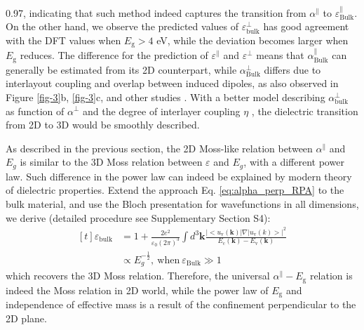 \documentclass[journal=ancac3,manuscript=article,email=true,hyperref=true,keywords=false]{achemso}
\begin{document}
0.97, indicating that such method indeed captures the transition from
$\alpha^{\parallel}$ to $\varepsilon_{\mathrm{Bulk}}^{\parallel}$. On
the other hand, we observe the predicted values of
$\varepsilon_{\mathrm{bulk}}^{\perp}$ has good agreement with the DFT
values when $E_{\mathrm{g}}>4$ eV, while the deviation becomes larger
when $E_{\mathrm{g}}$ reduces. The difference for the prediction of
$\varepsilon^{\parallel}$ and $\varepsilon^{\perp}$ means that
$\alpha^{\parallel}_{\mathrm{Bulk}}$ can generally be estimated from
its 2D counterpart, while $\alpha^{\perp}_{\mathrm{Bulk}}$ differs due
to interlayout coupling and overlap between induced dipoles, as also
observed in Figure \ref{fig-3}b, \ref{fig-3}c, and other studies
\cite{Andersen_2015_dielec_vdWH,Laturia_2018}. With a better model
describing $\alpha_{\mathrm{bulk}}^{\perp}$ as function of
$\alpha^{\perp}$ and the degree of interlayer coupling $\eta$
\cite{Tkatchenko_2012}, the dielectric transition from 2D to 3D would
be smoothly described. 

As described in the previous section, the 2D Moss-like relation
between $\alpha^{\parallel}$ and $E_{g}$ is similar to the 3D Moss
relation between $\varepsilon$ and $E_{g}$, with a different power
law. Such difference in the power law can indeed be explained by
modern theory of dielectric properties.  Extend the approach
Eq. \ref{eq:alpha_perp_RPA} to the bulk material, and use the Bloch
presentation for wavefunctions in all dimensions, we derive (detailed
procedure see Supplementary Section S4):
\begin{equation}
  \label{eq:alpha-Eg-3D}
  \begin{aligned}[t]
  \varepsilon_{\mathrm{bulk}} &= 1 + \frac{2e^{2}}{\varepsilon_{0}(2\pi)^{3}}\int d^{3}\mathbf{k}
  \frac{|<u_{\mathrm{v}}(\mathbf{k})|\nabla|u_{\mathrm{v}}(k)>|^{2}}
  {E_{\mathrm{c}}(\mathbf{k}) - E_{\mathrm{v}}(\mathbf{k})} \\
  &\propto E_{g}^{-\frac{1}{2}},\ \mathrm{when}\ \varepsilon_{\mathrm{Bulk}} \gg 1
\end{aligned}
\end{equation}
which recovers the 3D Moss relation. Therefore, the universal
$\alpha^{\parallel}-E_{\mathrm{g}}$ relation is indeed the Moss relation
in 2D world, while the power law of $E_{\mathrm{g}}$ and independence
of effective mass is a result of the confinement perpendicular to the
2D plane.
\end{document}
